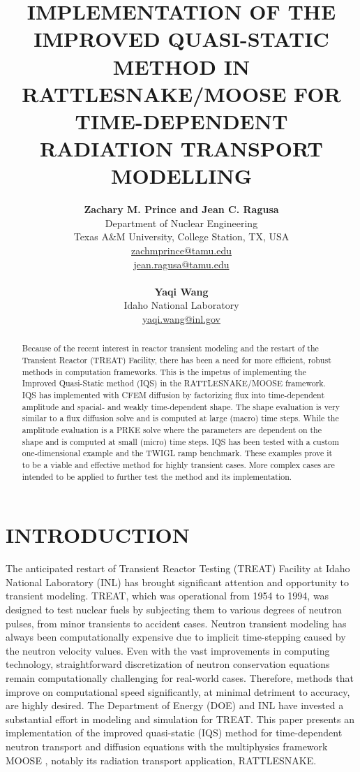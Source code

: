 \documentclass[12pt]{article}
\title{IMPLEMENTATION OF THE IMPROVED QUASI-STATIC METHOD IN RATTLESNAKE/MOOSE FOR TIME-DEPENDENT RADIATION TRANSPORT MODELLING}
\author{ 
  \textbf{Zachary M. Prince and Jean C. Ragusa} \\
  Department of Nuclear Engineering \\
  Texas A\&M University, College Station, TX, USA\\
  \href{mailto:zachmprince@tamu.edu}{zachmprince@tamu.edu}\\
  \href{mailto:jean.ragusa@tamu.edu}{jean.ragusa@tamu.edu}\\
  \\                       %
  \textbf{Yaqi Wang} \\
   Idaho National Laboratory \\
  \href{mailto:yaqi.wang@inl.gov}{yaqi.wang@inl.gov} 
}
\begin{document}


\maketitle

\begin{abstract}
Because of the recent interest in reactor transient modeling and the restart of the Transient Reactor (TREAT) Facility, there has been a need for more efficient, robust methods in computation frameworks.  This is the impetus of implementing the Improved Quasi-Static method (IQS) in the RATTLESNAKE/MOOSE framework.  IQS has implemented with CFEM diffusion by factorizing flux into time-dependent amplitude and spacial- and weakly time-dependent shape.  The shape evaluation is very similar to a flux diffusion solve and is computed at large (macro) time steps.  While the amplitude evaluation is a PRKE solve where the parameters are dependent on the shape and is computed at small (micro) time steps.  IQS has been tested with a custom one-dimensional example and the TWIGL ramp benchmark.  These examples prove it to be a viable and effective method for highly transient cases. More complex cases are intended to be applied to further test the method and its implementation.
\end{abstract}


%
\section{INTRODUCTION}
\label{sect::intro}

The anticipated restart of Transient Reactor Testing (TREAT) Facility at Idaho National Laboratory (INL) has brought significant attention and opportunity to transient modeling.  TREAT, which was operational from 1954 to 1994, was designed to test nuclear fuels by subjecting them to various degrees of neutron pulses, from minor transients to accident cases.  Neutron transient modeling has always been computationally expensive due to implicit time-stepping caused by the neutron velocity values. Even with the vast improvements in computing technology, straightforward discretization of neutron conservation equations remain computationally challenging for real-world cases.  Therefore, methods that improve on computational speed significantly, at minimal detriment to accuracy, are highly desired. The Department of Energy (DOE) and INL have invested a substantial effort in modeling and simulation for TREAT.  This paper presents an implementation of the improved quasi-static (IQS) method for time-dependent neutron transport and diffusion equations with the multiphysics framework MOOSE \cite{moose}, notably its radiation transport application, RATTLESNAKE.
\end{document}
